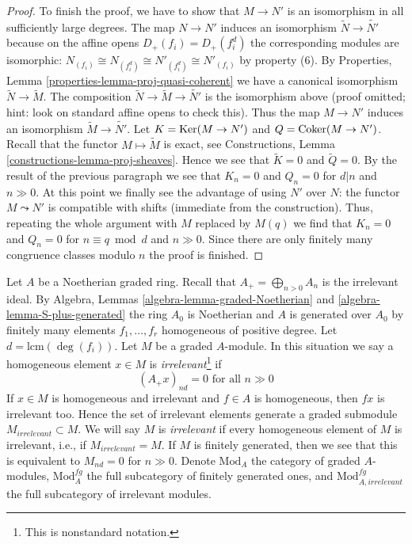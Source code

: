 \begin{proof}
\medskip\noindent
To finish the proof, we have to show that $M \to N'$ is an isomorphism
in all sufficiently large degrees. The map $N \to N'$ induces an
isomorphism $\widetilde{N} \to \widetilde{N'}$ because on the affine
opens $D_+(f_i) = D_+(f_i^d)$ the corresponding modules are isomorphic:
$N_{(f_i)} \cong N_{(f_i^d)} \cong N'_{(f_i^d)} \cong N'_{(f_i)}$
by property (6).
By Properties, Lemma \ref{properties-lemma-proj-quasi-coherent}
we have a canonical isomorphism $\widetilde{N} \to \widetilde{M}$.
The composition $\widetilde{N} \to \widetilde{M} \to \widetilde{N'}$
is the isomorphism above (proof omitted; hint: look on standard
affine opens to check this). Thus the map $M \to N'$ induces an isomorphism
$\widetilde{M} \to \widetilde{N'}$.
Let $K = \mathop{\mathrm{Ker}}(M \to N')$ and $Q = \mathop{\mathrm{Coker}}(M \to N')$.
Recall that the functor
$M \mapsto \widetilde{M}$ is exact, see
Constructions, Lemma \ref{constructions-lemma-proj-sheaves}.
Hence we see that $\widetilde{K} = 0$ and $\widetilde{Q} = 0$.
By the result of the previous paragraph we see that $K_n = 0$ and
$Q_n = 0$ for $d | n$ and $n \gg 0$. At this point we finally see
the advantage of using $N'$ over $N$: the functor $M \leadsto N'$
is compatible with shifts (immediate from the construction).
Thus, repeating the whole argument with $M$ replaced by $M(q)$
we find that $K_n = 0$ and $Q_n = 0$ for $n \equiv q \bmod d$
and $n \gg 0$. Since there are
only finitely many congruence classes modulo $n$ the proof is finished.
\end{proof}

\noindent
Let $A$ be a Noetherian graded ring. Recall that
$A_+ = \bigoplus_{n > 0} A_n$ is the irrelevant ideal.
By Algebra, Lemmas \ref{algebra-lemma-graded-Noetherian} and
\ref{algebra-lemma-S-plus-generated} the ring $A_0$ is Noetherian
and $A$ is generated over $A_0$ by finitely many elements
$f_1, \ldots, f_r$ homogeneous of positive degree.
Let $d = \text{lcm}(\deg(f_i))$. Let $M$ be a graded $A$-module.
In this situation we say a homogeneous element $x \in M$
is {\it irrelevant}\footnote{This is nonstandard notation.} if
$$
(A_+ x)_{nd} = 0\text{ for all }n \gg 0
$$
If $x \in M$ is homogeneous and irrelevant and $f \in A$
is homogeneous, then $fx$ is irrelevant too. Hence
the set of irrelevant elements generate a graded submodule
$M_{irrelevant} \subset M$. We will say $M$ is {\it irrelevant}
if every homogeneous element of $M$ is irrelevant, i.e.,
if $M_{irrelevant} = M$.
If $M$ is finitely generated, then we see that
this is equivalent to $M_{nd} = 0$ for $n \gg 0$.
Denote $\text{Mod}_A$ the category of graded $A$-modules,
$\text{Mod}^{fg}_A$ the full subcategory of finitely generated ones,
and $\text{Mod}^{fg}_{A, irrelevant}$ the full subcategory of
irrelevant modules.

